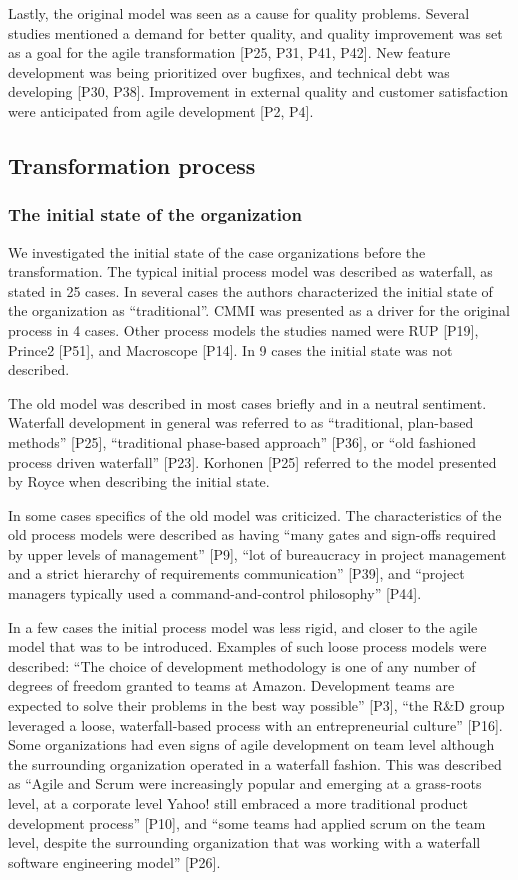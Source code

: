 \documentclass[preprint,authoryear,12pt]{elsarticle}
\begin{document}
Lastly, the original model was seen as a cause for quality problems.
Several studies mentioned a demand for better quality, and quality improvement
was set as a goal for the agile transformation [P25, P31, P41, P42]. New feature
development was being prioritized over bugfixes, and technical debt was
developing [P30, P38]. Improvement in external quality and customer satisfaction
were anticipated from agile development [P2, P4].


\clearpage

\subsection{Transformation process}

\subsubsection{The initial state of the organization}

We investigated the initial state of the case organizations before the
transformation. The typical initial process model was described as waterfall, as
stated in 25 cases. In several cases the authors characterized the initial state
of the organization as ``traditional''. CMMI was presented as a driver for the
original process in 4 cases. Other process models the studies named were RUP
[P19], Prince2 [P51], and Macroscope [P14]. In 9 cases the initial state was not
described.

The old model was described in most cases briefly and in a neutral sentiment.
Waterfall development in general was referred to as ``traditional, plan-based
methods'' [P25], ``traditional phase-based approach'' [P36], or ``old fashioned
process driven waterfall'' [P23]. Korhonen [P25] referred to the model presented
by Royce \cite{Royce1970} when describing the initial state.

In some cases specifics of the old model was criticized. The characteristics of
the old process models were described as having ``many gates and sign-offs
required by upper levels of management'' [P9], ``lot of bureaucracy in project
management and a strict hierarchy of requirements communication'' [P39], and
``project managers typically used a command-and-control philosophy'' [P44].

In a few cases the initial process model was less rigid, and closer to the agile
model that was to be introduced. Examples of such loose process models were
described: ``The choice of development methodology is one of any number of
degrees of freedom granted to teams at Amazon. Development teams are expected to
solve their problems in the best way possible'' [P3], ``the R\&D group leveraged
a loose, waterfall-based process with an entrepreneurial culture'' [P16]. Some
organizations had even signs of agile development on team level although the
surrounding organization operated in a waterfall fashion. This was described as
``Agile and Scrum were increasingly popular and emerging at a grass-roots level,
at a corporate level Yahoo! still embraced a more traditional product
development process'' [P10], and ``some teams had applied scrum on the team
level, despite the surrounding organization that was working with a waterfall
software engineering model'' [P26].
\end{document}
